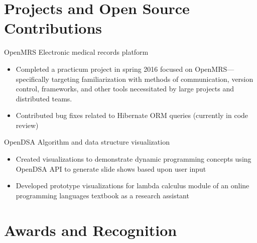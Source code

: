 \documentclass[12pt,letterpaper,sans]{moderncv}
\begin{document}
\section{Projects and Open Source Contributions}
   	\cventry[8pt]%
    	{}%
        {OpenMRS}%
        {Electronic medical records platform}%
        {}%
        {}%
        {\begin{itemize}%
            \item Completed a practicum project in spring 2016 focused on OpenMRS---specifically targeting familiarization with methods of communication, version control, frameworks, and other tools necessitated by large projects and distributed teams.
        \item Contributed bug fixes related to Hibernate ORM queries (currently in code review)%
		\end{itemize}}
   	\cventry[8pt]%
    	{}%
        {OpenDSA}%
        {Algorithm and data structure visualization}%
        {}%
        {}%
        {\begin{itemize}%
			\item Created visualizations to demonstrate dynamic programming concepts using OpenDSA API to generate slide shows based upon user input
            \item Developed prototype visualizations for lambda calculus module of an online programming languages textbook as a research assistant
		\end{itemize}}
\section{Awards and Recognition}
\newpage
\makecvtitle
\end{document}
